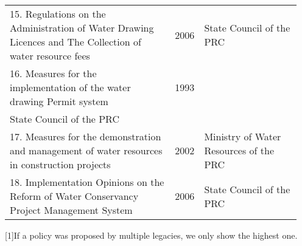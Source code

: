 \begin{table*}
\begin{minipage}{\linewidth}
{\begin{tabular}{p{0.6\linewidth}rp{0.35\linewidth}}
        15. Regulations on the Administration of Water Drawing Licences and The Collection of water resource fees & 2006 & State Council of the PRC \\
        16. Measures for the implementation of the water drawing Permit system & 1993 \\ State Council of the PRC \\
        17. Measures for the demonstration and management of water resources in construction projects & 2002 & Ministry of Water Resources of the PRC \\
        18. Implementation Opinions on the Reform of Water Conservancy Project Management System & 2006 & State Council of the PRC \\
        \bottomrule
    \end{tabular}}

    \footnotesize[1]{If a policy was proposed by multiple legacies, we only show the highest one.}
    \end{minipage}
\end{table*}
